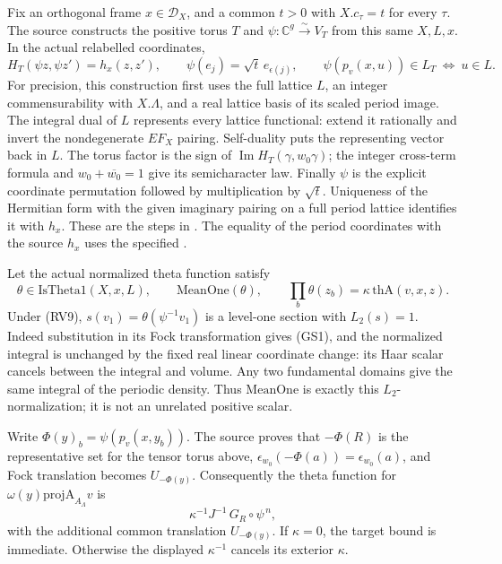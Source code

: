 Fix an orthogonal frame \(x\in\mathcal D_X\), and a common
\(t>0\) with \(X.c_\tau=t\) for every \(\tau\).
The source constructs the positive torus \(T\) and
\(\psi:\mathbb C^g\overset{\sim}\longrightarrow V_T\)
from this same \(X,L,x\).
In the actual relabelled coordinates,
\[
 H_T(\psi z,\psi z')=h_x(z,z'),\qquad
 \psi(e_j)=\sqrt t\,e_{\epsilon(j)},\qquad
 \psi(p_v(x,u))\in L_T\ \Longleftrightarrow\ u\in L.
 \tag{RV9}\label{eq:sr-source-self-torus}
\]
For precision, this construction first uses the full lattice
\(L\), an integer commensurability with \(X.\Lambda\), and a
real lattice basis of its scaled period image.
The integral dual of \(L\) represents every lattice functional:
extend it rationally and invert the nondegenerate \(EF_X\)
pairing. Self-duality puts the representing vector back in \(L\).
The torus factor is the sign of
\(\operatorname{Im}H_T(\gamma,w_0\gamma)\);
the integer cross-term formula and \(w_0+\overline{w_0}=1\)
give its semicharacter law.
Finally \(\psi\) is the explicit coordinate permutation followed
by multiplication by \(\sqrt t\).
Uniqueness of the Hermitian form with the given imaginary
pairing on a full period lattice identifies it with \(h_x\).
These are the steps in
.
The equality of the period coordinates with the source \(h_x\)
uses the specified .

Let the actual normalized theta function satisfy
\[
 \theta\in\mathrm{IsTheta1}(X,x,L),\qquad
 \mathrm{MeanOne}(\theta),\qquad
       \prod_b\theta(z_b)=\kappa\,\mathrm{thA}(v,x,z).
 \tag{RV10}\label{eq:sr-source-theta-vacuum-tie}
\]
Under (RV9), \(s(v_1)=\theta(\psi^{-1}v_1)\) is a level-one
section with \(L_2(s)=1\).
Indeed substitution in its Fock transformation gives (GS1),
and the normalized integral is unchanged by the fixed
real linear coordinate change: its Haar scalar cancels between
the integral and volume. Any two fundamental domains give the
same integral of the periodic density.
Thus \(\mathrm{MeanOne}\) is exactly this \(L_2\)-normalization;
it is not an unrelated positive scalar.

Write \(\Phi(y)_b=\psi(p_v(x,y_b))\).
The source proves that \(-\Phi(R)\) is the representative set
for the tensor torus above,
\(\epsilon_{w_0}(-\Phi(a))=\epsilon_{w_0}(a)\),
and Fock translation becomes \(U_{-\Phi(y)}\).
Consequently the theta function for
\(\omega(y)\mathrm{projA}_{A_\Lambda}v\) is
\[
                  \kappa^{-1}J^{-1}\,G_R\circ\psi^{\,n},
\]
with the additional common translation \(U_{-\Phi(y)}\).
If \(\kappa=0\), the target bound is immediate.
Otherwise the displayed \(\kappa^{-1}\) cancels its exterior
\(\kappa\).

